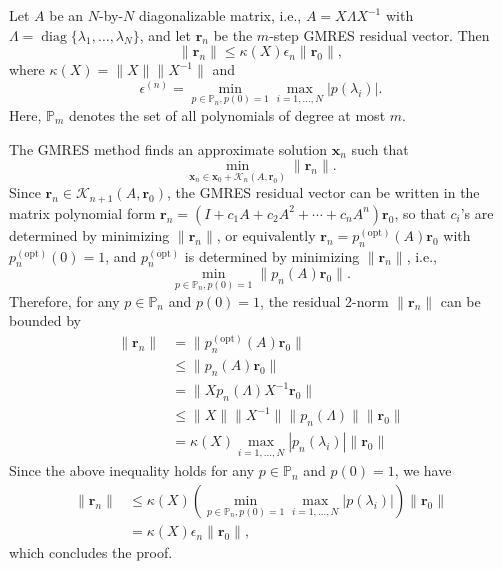 \par{}
\begin{Proposition}\label{prop:gmres-diagonalizable-bound}
{Let $A$ be an $N$-by-$N$ diagonalizable matrix, i.e., $A=X\Lambda X^{-1}$ with $\Lambda=\operatorname{diag}\{\lambda_1,\ldots,\lambda_N\}$, and let $\bm r_n$ be the $m$-step GMRES residual vector. Then}
\[\|\bm r_n\|\le\kappa(X)\epsilon_n\|\bm r_0\|,\]
{where $\kappa(X)=\|X\|\|X^{-1}\|$ and}
\[\epsilon^{(n)}=\min_{p\in\mathbb P_n,p(0)=1}\max_{i=1,\ldots,N}|p(\lambda_i)|.\]
{Here, $\mathbb P_m$ denotes the set of all polynomials of degree at most $m$.}
\end{Proposition}
\begin{Proof}
{The GMRES method finds an approximate solution $\bm x_n$ such that}
\[\min_{\bm x_n\in\bm x_0+\mathcal K_n(A,\bm r_0)}\|\bm r_n\|.\]
{Since $\bm r_n\in\mathcal K_{n+1}(A,\bm r_0)$, the GMRES residual vector can be written in the matrix polynomial form $\bm r_n=(I+c_1A+c_2A^2+\cdots+c_nA^n)\bm r_0$, so that $c_i$'s are determined by minimizing $\|\bm r_n\|$, or equivalently $\bm r_n=p_n^{(\mathrm{opt})}(A)\bm r_0$ with $p_n^{(\mathrm{opt})}(0)=1$, and $p_n^{(\mathrm{opt})}$ is determined by minimizing $\|\bm r_n\|$, i.e.,}
\[\min_{p\in\mathbb P_n,p(0)=1}\|p_n(A)\bm r_0\|.\]
{Therefore, for any $p\in\mathbb P_n$ and $p(0)=1$, the residual 2-norm $\|\bm r_n\|$ can be bounded by}
\[\begin{aligned}\|\bm r_n\|&=\|p_n^{(\mathrm{opt})}(A)\bm r_0\|\\&\le\|p_n(A)\bm r_0\|\\&=\|Xp_n(\Lambda)X^{-1}\bm r_0\|\\&\le\|X\|\|X^{-1}\|\|p_n(\Lambda)\|\|\bm r_0\|\\&=\kappa(X)\max_{i=1,\ldots,N}|p_n(\lambda_i)|\|\bm r_0\|\end{aligned}\]
{Since the above inequality holds for any $p\in\mathbb P_n$ and $p(0)=1$, we have}
\[\begin{aligned}\|\bm r_n\|&\le\kappa(X)\left(\min_{p\in\mathbb P_n,p(0)=1}\max_{i=1,\ldots,N}|p(\lambda_i)|\right)\|\bm r_0\|\\&=\kappa(X)\epsilon_n\|\bm r_0\|,\end{aligned}\]
{which concludes the proof.}
\par\nopagebreak[4]
\end{Proof}
